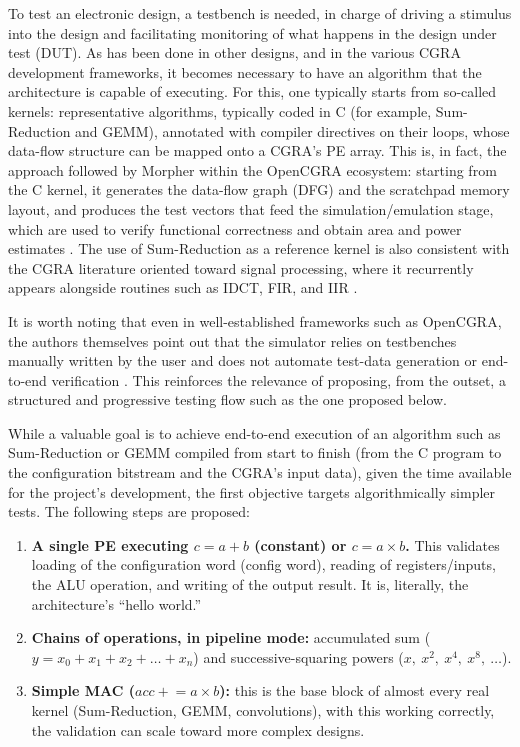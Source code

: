 \documentclass[conference]{IEEEtran}
\begin{document}
To test an electronic design, a testbench is needed, in charge of driving a stimulus into the design and facilitating monitoring of what happens in the design under test (DUT). 
As has been done in other designs, and in the various CGRA development frameworks, it becomes necessary to have an algorithm that the architecture is capable of executing. 
For this, one typically starts from so-called kernels: representative algorithms, typically coded in C (for example, Sum-Reduction and GEMM), annotated with compiler directives on their loops, whose data-flow structure can be mapped onto a CGRA's PE array. 
This is, in fact, the approach followed by Morpher within the OpenCGRA ecosystem: starting from the C kernel, it generates the data-flow graph (DFG) and the scratchpad memory layout, and produces the test vectors that feed the simulation/emulation stage, which are used to verify functional correctness and obtain area and power estimates \cite{Juneja}. 
The use of Sum-Reduction as a reference kernel is also consistent with the CGRA literature oriented toward signal processing, where it recurrently appears alongside routines such as IDCT, FIR, and IIR \cite{Podobas}.

It is worth noting that even in well-established frameworks such as OpenCGRA, the authors themselves point out that the simulator relies on testbenches manually written by the user and does not automate test-data generation or end-to-end verification \cite{Juneja}. 
This reinforces the relevance of proposing, from the outset, a structured and progressive testing flow such as the one proposed below.

While a valuable goal is to achieve end-to-end execution of an algorithm such as Sum-Reduction or GEMM compiled from start to finish (from the C program to the configuration bitstream and the CGRA's input data), given the time available for the project's development, the first objective targets algorithmically simpler tests. 
The following steps are proposed:

\begin{enumerate}
    \item \textbf{A single PE executing $c = a + b$ (constant) or $c = a \times b$.} This validates loading of the configuration word (config word), reading of registers/inputs, the ALU operation, and writing of the output result. It is, literally, the architecture's ``hello world.''
    \item \textbf{Chains of operations, in pipeline mode:} accumulated sum ($y = x_0 + x_1 + x_2 + \dots + x_n$) and successive-squaring powers ($x,\ x^2,\ x^4,\ x^8,\ \dots$).
    \item \textbf{Simple MAC ($acc \mathrel{+}= a \times b$):} this is the base block of almost every real kernel (Sum-Reduction, GEMM, convolutions), with this working correctly, the validation can scale toward more complex designs.
\end{enumerate}
\end{document}
